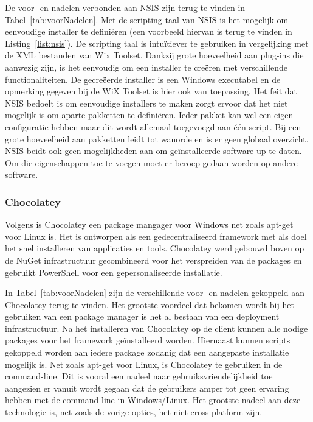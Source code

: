 De voor- en nadelen verbonden aan NSIS zijn terug te vinden in Tabel~\ref{tab:voorNadelen}.
Met de scripting taal van NSIS is het mogelijk om eenvoudige installer te definiëren (een voorbeeld hiervan is terug te vinden in Listing~\vref{list:nsis}).
De scripting taal is intuïtiever te gebruiken in vergelijking met de XML bestanden van Wix Toolset.
Dankzij grote hoeveelheid aan plug-ins die aanwezig zijn, is het eenvoudig om een installer te creëren met verschillende functionaliteiten.
De gecreëerde installer is een Windows executabel en de opmerking gegeven bij de WiX Toolset is hier ook van toepassing.
Het feit dat NSIS bedoelt is om eenvoudige installers te maken zorgt ervoor dat het niet mogelijk is om aparte pakketten te definiëren.
Ieder pakket kan wel een eigen configuratie hebben maar dit wordt allemaal toegevoegd aan één script.
Bij een grote hoeveelheid aan pakketten leidt tot wanorde en is er geen globaal overzicht.
NSIS beidt ook geen mogelijkheden aan om geïnstalleerde software up te daten.
Om die eigenschappen toe te voegen moet er beroep gedaan worden op andere software.

\subsubsection{Chocolatey}
Volgens \citet{chocoAbout} is Chocolatey een package mangager voor Windows net zoals apt-get voor Linux is.
Het is ontworpen als een gedecentraliseerd framework met als doel het snel installeren van applicaties en tools.
Chocolatey werd gebouwd boven op de NuGet infrastructuur gecombineerd voor het verspreiden van de packages en gebruikt PowerShell voor een gepersonaliseerde installatie.

In Tabel~\ref{tab:voorNadelen} zijn de verschillende voor- en nadelen gekoppeld aan Chocolatey terug te vinden.
Het grootste voordeel dat bekomen wordt bij het gebruiken van een package manager is het al bestaan van een deployment infrastructuur. 
Na het installeren van Chocolatey op de client kunnen alle nodige packages voor het framework geïnstalleerd worden.
Hiernaast kunnen scripts gekoppeld worden aan iedere package zodanig dat een aangepaste installatie mogelijk is.
Net zoals apt-get voor Linux, is Chocolatey te gebruiken in de command-line.
Dit is vooral een nadeel naar gebruiksvriendelijkheid toe aangezien er vanuit wordt gegaan dat de gebruikers amper tot geen ervaring hebben met de command-line in Windows/Linux.
Het grootste nadeel aan deze technologie is, net zoals de vorige opties, het niet cross-platform zijn.

